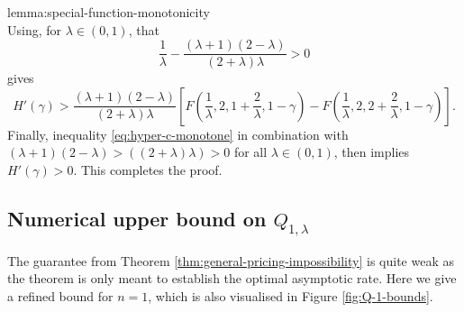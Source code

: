 \documentclass[11pt]{article}
\begin{document}
\begin{cleverproof}{lemma:special-function-monotonicity}
$$    $$
    Using, for $\lambda \in (0,1)$, that
    $$
    \frac{1}{\lambda}-\frac{(\lambda+1)(2-\lambda)}{\left(2+\lambda\right)\lambda}>0
    $$
    gives
    $$
    H'(\gamma) > \frac{(\lambda+1)(2-\lambda)}{\left(2+\lambda\right)\lambda} \left[ F\left(\frac{1}{\lambda},2,1+\frac{2}{\lambda},1-\gamma\right) - F\left(\frac{1}{\lambda},2,2+\frac{2}{\lambda},1-\gamma\right)\right].
    $$
    Finally, inequality \eqref{eq:hyper-c-monotone} in combination with $(\lambda+1)(2-\lambda) > ((2+\lambda)\lambda) > 0$ for all $\lambda \in (0,1)$, then implies $H'(\gamma) > 0$. This completes the proof.
\end{cleverproof}

\subsection{Numerical upper bound on \texorpdfstring{$Q_{1,\lambda}$}{Q 1,lambda}}\label{appendix:numerical-bounds}
The guarantee from Theorem \ref{thm:general-pricing-impossibility} is quite weak as the theorem is only meant to establish the optimal asymptotic rate.
Here we give a refined bound for $n=1$, which is also visualised in Figure \ref{fig:Q-1-bounds}.
\end{document}

